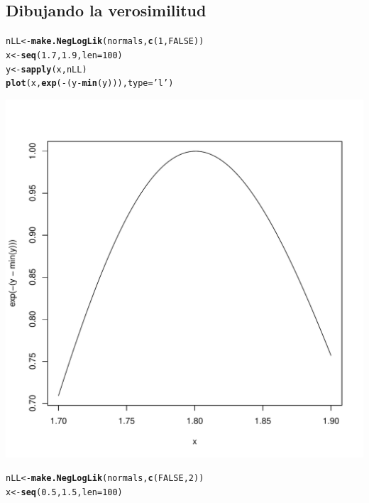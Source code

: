 \documentclass{article}\usepackage[]{graphicx}\usepackage[]{color}
\makeatletter
\def\maxwidth{ %
  \ifdim\Gin@nat@width>\linewidth
    \linewidth
  \else
    \Gin@nat@width
  \fi
}
\newcommand{\hlnum}[1]{\textcolor[rgb]{0.686,0.059,0.569}{#1}}%
\newcommand{\hlstr}[1]{\textcolor[rgb]{0.192,0.494,0.8}{#1}}%
\newcommand{\hlopt}[1]{\textcolor[rgb]{0,0,0}{#1}}%
\newcommand{\hlstd}[1]{\textcolor[rgb]{0.345,0.345,0.345}{#1}}%
\newcommand{\hlkwb}[1]{\textcolor[rgb]{0.69,0.353,0.396}{#1}}%
\newcommand{\hlkwc}[1]{\textcolor[rgb]{0.333,0.667,0.333}{#1}}%
\newcommand{\hlkwd}[1]{\textcolor[rgb]{0.737,0.353,0.396}{\textbf{#1}}}%
\newenvironment{kframe}{%
 \def\at@end@of@kframe{}%
 \ifinner\ifhmode%
  \def\at@end@of@kframe{\end{minipage}}%
  \begin{minipage}{\columnwidth}%
 \fi\fi%
 \def\FrameCommand##1{\hskip\@totalleftmargin \hskip-\fboxsep
 \colorbox{shadecolor}{##1}\hskip-\fboxsep
     \hskip-\linewidth \hskip-\@totalleftmargin \hskip\columnwidth}%
 \MakeFramed {\advance\hsize-\width
   \@totalleftmargin\z@ \linewidth\hsize
   \@setminipage}}%
 {\par\unskip\endMakeFramed%
 \at@end@of@kframe}
\newenvironment{knitrout}{}{} %
\makeatother
\begin{document}
  \subsection{Dibujando la verosimilitud}
\begin{knitrout}
\color{fgcolor}\begin{kframe}
\begin{alltt}
\hlstd{nLL} \hlkwb{<-} \hlkwd{make.NegLogLik}\hlstd{(normals,} \hlkwd{c}\hlstd{(}\hlnum{1}\hlstd{,} \hlnum{FALSE}\hlstd{))}
\hlstd{x} \hlkwb{<-} \hlkwd{seq}\hlstd{(}\hlnum{1.7}\hlstd{,} \hlnum{1.9}\hlstd{,} \hlkwc{len} \hlstd{=} \hlnum{100}\hlstd{)}
\hlstd{y} \hlkwb{<-} \hlkwd{sapply}\hlstd{(x, nLL)}
\hlkwd{plot}\hlstd{(x,} \hlkwd{exp}\hlstd{(}\hlopt{-}\hlstd{(y} \hlopt{-} \hlkwd{min}\hlstd{(y))),} \hlkwc{type} \hlstd{=} \hlstr{'l'}\hlstd{)}
\end{alltt}
\end{kframe}
\includegraphics[width=\maxwidth]{figure/unnamed-chunk-93-1} 
\begin{kframe}\begin{alltt}
\hlstd{nLL} \hlkwb{<-} \hlkwd{make.NegLogLik}\hlstd{(normals,} \hlkwd{c}\hlstd{(}\hlnum{FALSE}\hlstd{,} \hlnum{2}\hlstd{))}
\hlstd{x} \hlkwb{<-} \hlkwd{seq}\hlstd{(}\hlnum{0.5}\hlstd{,} \hlnum{1.5}\hlstd{,} \hlkwc{len} \hlstd{=} \hlnum{100}\hlstd{)}

\end{alltt}
\end{kframe}
\end{knitrout}
\end{document}
